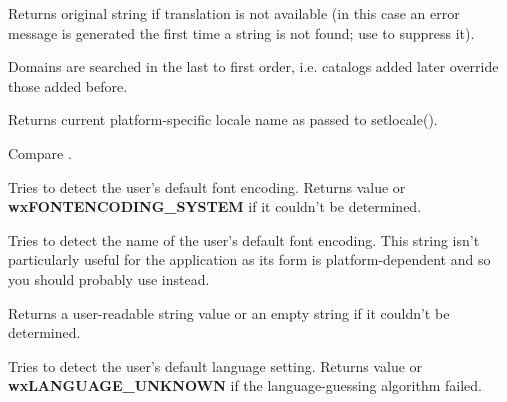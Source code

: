 Returns original string if translation is not available
(in this case an error message is generated the first time
a string is not found; use  to suppress it).


Domains are searched in the last to first order, i.e. catalogs
added later override those added before.

\label{wxlocalegetsysname}


Returns current platform-specific locale name as passed to setlocale().

Compare .


\label{wxlocalegetsystemencoding}


Tries to detect the user's default font encoding.
Returns  value or 
{\bf wxFONTENCODING\_SYSTEM} if it couldn't be determined.

\label{wxlocalegetsystemencodingname}


Tries to detect the name of the user's default font encoding. This string isn't
particularly useful for the application as its form is platform-dependent and
so you should probably use 
 instead.

Returns a user-readable string value or an empty string if it couldn't be
determined.

\label{wxlocalegetsystemlanguage}


Tries to detect the user's default language setting.
Returns  value or 
 {\bf wxLANGUAGE\_UNKNOWN} if the language-guessing algorithm failed.


\label{wxlocaleinit}



